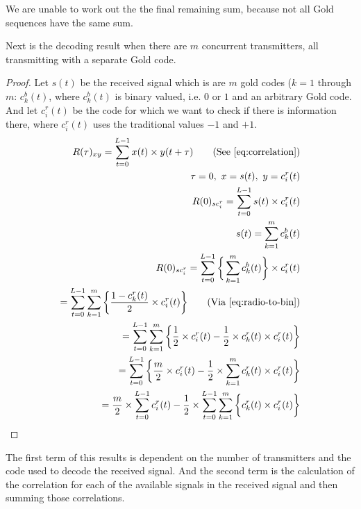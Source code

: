 		We are unable to work out the the final remaining sum, because not all Gold sequences have the same sum.

		Next is the decoding result when there are $m$ concurrent transmitters, all transmitting with a separate Gold code.


		\begin{proof}
			Let $s(t)$ be the received signal which is are $m$ gold codes ($k = 1$ through $m$: $c^b_k(t)$, where $c^b_k(t)$ is binary valued, i.e. $0$ or $1$ and an arbitrary Gold code.\\
			And let $c^r_i(t)$ be the code for which we want to check if there is information there, where $c^r_i(t)$ uses the traditional values $-1$ and $+1$. \\

			\begin{align*}
				R(\tau)_{xy} = \displaystyle\sum_{t = 0} ^ {L - 1} x(t) \times y(t + \tau)	\tag{See \autoref{eq:correlation}}
				\\ \tau = 0,\ x = s(t),\ y = c^r_i(t)	
				\\ R(0)_{sc^r_{i}} = \displaystyle\sum_{t = 0} ^ {L - 1} s(t) \times c^r_i(t)	
				\\ s(t) = \displaystyle\sum_{k = 1} ^ {m} c^b_k(t)						
				\\ R(0)_{sc^r_{i}} = \displaystyle\sum_{t = 0} ^ {L - 1} \bigg\{ \displaystyle\sum_{k = 1} ^ {m} c^b_k(t) \bigg\} \times c^r_i(t)
				\\ = \displaystyle\sum_{t = 0} ^ {L - 1} \displaystyle\sum_{k = 1} ^ {m} \bigg\{ \frac{1 - c^r_k(t)}{2} \times c^r_i(t) \bigg\} \tag{Via \autoref{eq:radio-to-bin}}
				\\ = \displaystyle\sum_{t = 0} ^ {L - 1} \displaystyle\sum_{k = 1} ^ {m} \bigg\{ \frac{1}{2} \times c^r_i(t) - \frac{1}{2} \times c^r_k(t) \times c^r_i(t) \bigg\} 
				\\ = \displaystyle\sum_{t = 0} ^ {L - 1} \bigg\{ \frac{m}{2} \times c^r_i(t) - \frac{1}{2} \times \displaystyle\sum_{k = 1} ^ {m} c^r_k(t) \times c^r_i(t) \bigg\} 
				\\ = \frac{m}{2} \times \displaystyle\sum_{t = 0} ^ {L - 1} c^r_i(t) - \frac{1}{2} \times \displaystyle\sum_{t = 0} ^ {L - 1} \displaystyle\sum_{k = 1} ^ {m} \bigg\{ c^r_k(t) \times c^r_i(t) \bigg\}
			\end{align*}

		\end{proof}

		The first term of this results is dependent on the number of transmitters and the code used to decode the received signal.
		And the second term is the calculation of the correlation for each of the available signals in the received signal and then summing those correlations.

